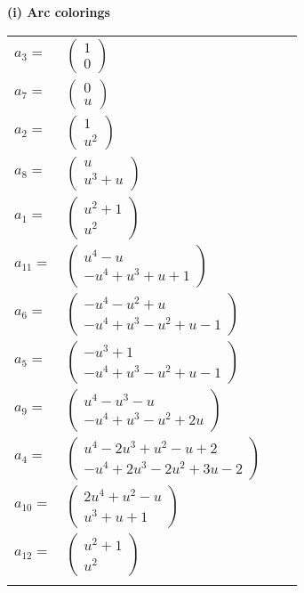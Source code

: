 \documentclass[1p]{elsarticle_modified}
\theoremstyle{definition}
\begin{document}
\flushleft \textbf{(i) Arc colorings}\\
\begin{tabular}{m{7pt} m{180pt} m{7pt} m{180pt} }
\flushright $a_{3}=$&$\begin{pmatrix}1\\0\end{pmatrix}$ \\
\flushright $a_{7}=$&$\begin{pmatrix}0\\u\end{pmatrix}$ \\
\flushright $a_{2}=$&$\begin{pmatrix}1\\u^2\end{pmatrix}$ \\
\flushright $a_{8}=$&$\begin{pmatrix}u\\u^3+u\end{pmatrix}$ \\
\flushright $a_{1}=$&$\begin{pmatrix}u^2+1\\u^2\end{pmatrix}$ \\
\flushright $a_{11}=$&$\begin{pmatrix}u^4- u\\- u^4+u^3+u+1\end{pmatrix}$ \\
\flushright $a_{6}=$&$\begin{pmatrix}- u^4- u^2+u\\- u^4+u^3- u^2+u-1\end{pmatrix}$ \\
\flushright $a_{5}=$&$\begin{pmatrix}- u^3+1\\- u^4+u^3- u^2+u-1\end{pmatrix}$ \\
\flushright $a_{9}=$&$\begin{pmatrix}u^4- u^3- u\\- u^4+u^3- u^2+2 u\end{pmatrix}$ \\
\flushright $a_{4}=$&$\begin{pmatrix}u^4-2 u^3+u^2- u+2\\- u^4+2 u^3-2 u^2+3 u-2\end{pmatrix}$ \\
\flushright $a_{10}=$&$\begin{pmatrix}2 u^4+u^2- u\\u^3+u+1\end{pmatrix}$ \\
\flushright $a_{12}=$&$\begin{pmatrix}u^2+1\\u^2\end{pmatrix}$\\&\end{tabular}
\end{document}
